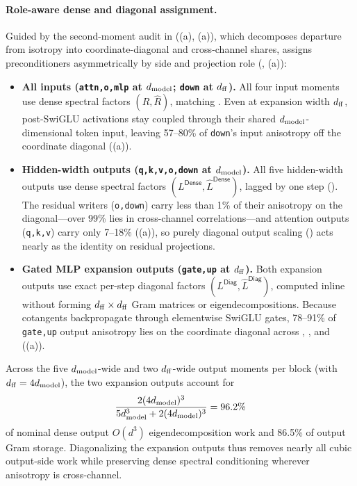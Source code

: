 

\paragraph{Role-aware dense and diagonal assignment.}
Guided by the second-moment audit in  ((a), (a)), which decomposes departure from isotropy into coordinate-diagonal and cross-channel shares,  assigns preconditioners asymmetrically by side and projection role (, (a)):
\begin{itemize}
 \item \textbf{All inputs (\texttt{attn,o,mlp} at $d_{\mathrm{model}}$; \texttt{down} at $d_{\mathrm{ff}}$).} All four input moments use dense spectral factors $(R,\hat R)$, matching . Even at expansion width $d_{\mathrm{ff}}$, post-SwiGLU activations stay coupled through their shared $d_{\mathrm{model}}$-dimensional token input, leaving 57--80\% of \texttt{down}'s input anisotropy off the coordinate diagonal ((a)).
 \item \textbf{Hidden-width outputs (\texttt{q,k,v,o,down} at $d_{\mathrm{model}}$).} All five hidden-width outputs use dense spectral factors $(L^{\mathsf{Dense}},\hat L^{\mathsf{Dense}})$, lagged by one step (). The residual writers (\texttt{o,down}) carry less than 1\% of their anisotropy on the diagonal---over 99\% lies in cross-channel correlations---and attention outputs (\texttt{q,k,v}) carry only 7--18\% ((a)), so purely diagonal output scaling () acts nearly as the identity on residual projections.
 \item \textbf{Gated MLP expansion outputs (\texttt{gate,up} at $d_{\mathrm{ff}}$).} Both expansion outputs use exact per-step diagonal factors $(L^{\mathsf{Diag}},\hat L^{\mathsf{Diag}})$, computed inline without forming $d_{\mathrm{ff}}\times d_{\mathrm{ff}}$ Gram matrices or eigendecompositions. Because cotangents backpropagate through elementwise SwiGLU gates, 78--91\% of \texttt{gate,up} output anisotropy lies on the coordinate diagonal across , , and  ((a)).
\end{itemize}
Across the five $d_{\mathrm{model}}$-wide and two $d_{\mathrm{ff}}$-wide output moments per block (with $d_{\mathrm{ff}}=4d_{\mathrm{model}}$), the two expansion outputs account for
\begin{equation}
 \frac{2(4d_{\mathrm{model}})^3}{5d_{\mathrm{model}}^3+2(4d_{\mathrm{model}})^3}=96.2\%
 \label{eq:cubic_share}
\end{equation}
of nominal dense output $O(d^3)$ eigendecomposition work and 86.5\% of output Gram storage. Diagonalizing the expansion outputs thus removes nearly all cubic output-side work while preserving dense spectral conditioning wherever anisotropy is cross-channel.

